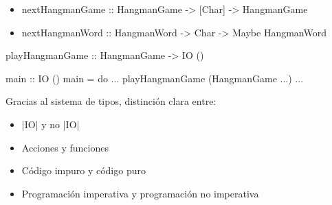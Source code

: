 \documentclass[spanish]{beamer}
\begin{document}

\begin{frame}[fragile]
  \begin{itemize}
  \item
    \begin{code}
nextHangmanGame :: HangmanGame
                -> [Char]
                -> HangmanGame
    \end{code}
  \item
    \begin{code}
nextHangmanWord :: HangmanWord
                -> Char
                -> Maybe HangmanWord
    \end{code}
  \end{itemize}
\end{frame}


\begin{frame}[fragile]
  \begin{code}
playHangmanGame :: HangmanGame -> IO ()
  \end{code}
\end{frame}


\begin{frame}[fragile]
  \begin{code}
main :: IO ()
main = do
  ...
  playHangmanGame (HangmanGame ...)
  ...
  \end{code}
\end{frame}


\begin{frame}[fragile]
  Gracias al sistema de tipos, distinción clara entre:
  \begin{itemize}
  \item |IO| y no |IO|
  \item Acciones y funciones
  \item Código impuro y código puro
  \item Programación imperativa y programación no imperativa
  \end{itemize}
\end{frame}

\end{document}
